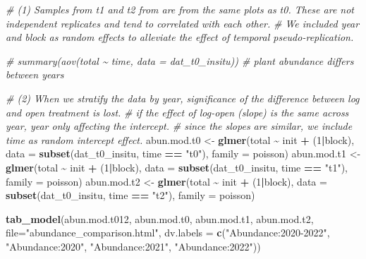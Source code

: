 \documentclass[
]{article}
\newenvironment{Shaded}{\begin{snugshade}}{\end{snugshade}}
\newcommand{\AttributeTok}[1]{\textcolor[rgb]{0.13,0.29,0.53}{#1}}
\newcommand{\CommentTok}[1]{\textcolor[rgb]{0.56,0.35,0.01}{\textit{#1}}}
\newcommand{\DecValTok}[1]{\textcolor[rgb]{0.00,0.00,0.81}{#1}}
\newcommand{\FunctionTok}[1]{\textcolor[rgb]{0.13,0.29,0.53}{\textbf{#1}}}
\newcommand{\NormalTok}[1]{#1}
\newcommand{\OtherTok}[1]{\textcolor[rgb]{0.56,0.35,0.01}{#1}}
\newcommand{\SpecialCharTok}[1]{\textcolor[rgb]{0.81,0.36,0.00}{\textbf{#1}}}
\newcommand{\StringTok}[1]{\textcolor[rgb]{0.31,0.60,0.02}{#1}}
\begin{document}
\begin{Shaded}
\begin{Highlighting}[]
\CommentTok{\# (1) Samples from t1 and t2 from are from the same plots as t0. These are not independent replicates and tend to correlated with each other.}
\CommentTok{\# We included year and block as random effects to alleviate the effect of temporal pseudo{-}replication.}

\CommentTok{\# summary(aov(total \textasciitilde{} time, data = dat\_t0\_insitu)) \# plant abundance differs between years}

\CommentTok{\# (2) When we stratify the data by year, significance of the difference between log and open treatment is lost.}
\CommentTok{\# if the effect of log{-}open (slope) is the same across year, year only affecting the intercept.}
\CommentTok{\# since the slopes are similar, we include time as random intercept effect.}
\NormalTok{abun.mod.t0 }\OtherTok{\textless{}{-}} \FunctionTok{glmer}\NormalTok{(total }\SpecialCharTok{\textasciitilde{}}\NormalTok{ init }\SpecialCharTok{+}\NormalTok{ (}\DecValTok{1}\SpecialCharTok{|}\NormalTok{block), }\AttributeTok{data =} \FunctionTok{subset}\NormalTok{(dat\_t0\_insitu, time }\SpecialCharTok{==} \StringTok{"t0"}\NormalTok{), }\AttributeTok{family =}\NormalTok{ poisson)}
\NormalTok{abun.mod.t1 }\OtherTok{\textless{}{-}} \FunctionTok{glmer}\NormalTok{(total }\SpecialCharTok{\textasciitilde{}}\NormalTok{ init }\SpecialCharTok{+}\NormalTok{ (}\DecValTok{1}\SpecialCharTok{|}\NormalTok{block), }\AttributeTok{data =} \FunctionTok{subset}\NormalTok{(dat\_t0\_insitu, time }\SpecialCharTok{==} \StringTok{"t1"}\NormalTok{), }\AttributeTok{family =}\NormalTok{ poisson)}
\NormalTok{abun.mod.t2 }\OtherTok{\textless{}{-}} \FunctionTok{glmer}\NormalTok{(total }\SpecialCharTok{\textasciitilde{}}\NormalTok{ init }\SpecialCharTok{+}\NormalTok{ (}\DecValTok{1}\SpecialCharTok{|}\NormalTok{block), }\AttributeTok{data =} \FunctionTok{subset}\NormalTok{(dat\_t0\_insitu, time }\SpecialCharTok{==} \StringTok{"t2"}\NormalTok{), }\AttributeTok{family =}\NormalTok{ poisson)}

\FunctionTok{tab\_model}\NormalTok{(abun.mod.t012, abun.mod.t0, abun.mod.t1, abun.mod.t2, }\AttributeTok{file=}\StringTok{"abundance\_comparison.html"}\NormalTok{, }\AttributeTok{dv.labels =} \FunctionTok{c}\NormalTok{(}\StringTok{"Abundance:2020{-}2022"}\NormalTok{, }\StringTok{"Abundance:2020"}\NormalTok{, }\StringTok{"Abundance:2021"}\NormalTok{, }\StringTok{"Abundance:2022"}\NormalTok{))}
\end{Highlighting}
\end{Shaded}

~
\end{document}
